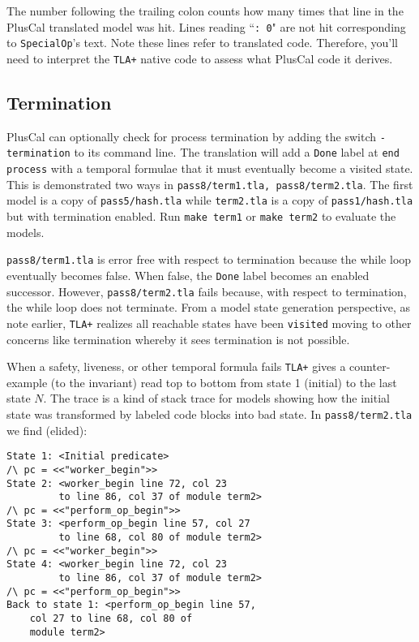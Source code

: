 \documentclass[twocolumn]{article}
\begin{document}
The number following the trailing colon counts how many times that line in the PlusCal translated model was hit. Lines reading ``\texttt{: 0}" are not hit corresponding to \texttt{SpecialOp}'s text. Note these lines refer to translated code. Therefore, you'll need to interpret the \texttt{TLA+} native code to assess what PlusCal code it derives. 

\subsection{Termination}
PlusCal can optionally check for process termination by adding the switch \texttt{-termination} to its command line. The translation will add a \texttt{Done} label at \texttt{end process} with a temporal formulae that it must eventually become a visited state. This is demonstrated two ways in \texttt{pass8/term1.tla, pass8/term2.tla}. The first model is a copy of \texttt{pass5/hash.tla} while \texttt{term2.tla} is a copy of \texttt{pass1/hash.tla} but with termination enabled. Run \texttt{make term1} or \texttt{make term2} to evaluate the models.

\texttt{pass8/term1.tla} is error free with respect to termination because the while loop eventually becomes false. When false, the \texttt{Done} label becomes an enabled successor. However, \texttt{pass8/term2.tla} fails because, with respect to termination, the while loop does not terminate. From a model state generation perspective, as note earlier, \texttt{TLA+} realizes all reachable states have been \texttt{visited} moving to other concerns like termination whereby it sees termination is not possible.

When a safety, liveness, or other temporal formula fails \texttt{TLA+} gives a counter-example (to the invariant) read top to bottom from state 1 (initial) to the last state $N$. The trace is a kind of stack trace for models showing how the initial state was transformed by labeled code blocks into bad state. In \texttt{pass8/term2.tla} we find (elided):

\begin{verbatim}
State 1: <Initial predicate>
/\ pc = <<"worker_begin">>
State 2: <worker_begin line 72, col 23 
         to line 86, col 37 of module term2>
/\ pc = <<"perform_op_begin">>
State 3: <perform_op_begin line 57, col 27
         to line 68, col 80 of module term2>
/\ pc = <<"worker_begin">>
State 4: <worker_begin line 72, col 23 
         to line 86, col 37 of module term2>
/\ pc = <<"perform_op_begin">>
Back to state 1: <perform_op_begin line 57, 
    col 27 to line 68, col 80 of 
    module term2>
\end{verbatim}
 
\end{document}
